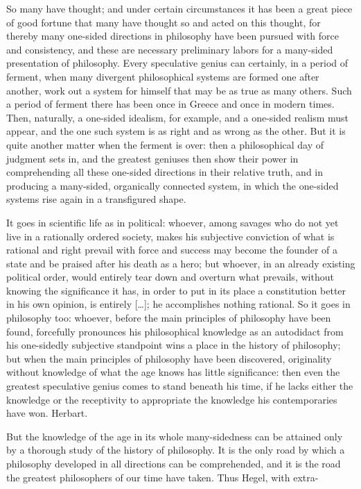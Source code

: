 \documentclass[12pt]{article}
\newcommand{\opage}[1]{\marginnote{\footnotesize\textit{[#1]}}}
\begin{document}
So many have thought; and under certain circumstances it has been a great piece of good fortune that many have thought so and acted on this thought, for thereby many one-sided directions in philosophy have been pursued with force and consistency, and these are necessary preliminary labors for a many-sided presentation of philosophy. Every speculative genius can certainly, in a period of ferment, when many divergent philosophical systems are formed one after another, work out a system for himself that may be as true as many others. Such a period of ferment there has been once in Greece and once in modern times. Then, naturally, a one-sided idealism, for example, and a one-sided realism must appear, and the one such system is as right and as wrong as the other. But it is quite another matter when the ferment is over: then a philosophical day of judgment sets in, and the greatest geniuses then show their power in comprehending all these one-sided directions in their relative truth, and in producing a many-sided, organically connected system, in which the one-sided\opage{8v} systems rise again in a transfigured shape.
\par It goes in scientific life as in political: whoever, among savages who do not yet live in a rationally ordered society, makes his subjective conviction of what is rational and right prevail with force and success may become the founder of a state and be praised after his death as a hero; but whoever, in an already existing political order, would entirely tear down and overturn what prevails, without knowing the significance it has, in order to put in its place a constitution better in his own opinion, is entirely [\dots]; he accomplishes nothing rational. %
So it goes in philosophy too: whoever, before the main principles of philosophy have been found, forcefully pronounces his philosophical knowledge as an autodidact from his one-sidedly subjective standpoint wins a place in the history of philosophy; but when the main principles of philosophy have been discovered, originality without knowledge of what the age knows has little significance: then even the greatest speculative genius comes to stand beneath his time, if he lacks either the knowledge or the receptivity to appropriate the knowledge his contemporaries have won. Herbart.

But the knowledge of the age in its whole many-sidedness can be attained only by a thorough study of the history of philosophy. It is the only road by which a philosophy developed in all directions can be comprehended, and it is the road the greatest philosophers of our time have taken. Thus Hegel, with extra-
\end{document}
